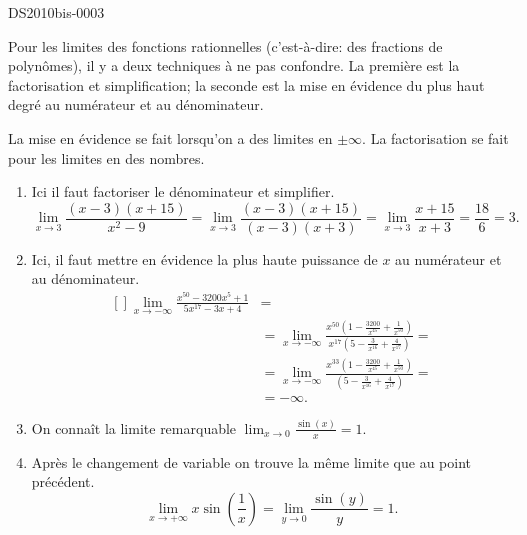 
\begin{corrige}{DS2010bis-0003}

	Pour les limites des fonctions rationnelles (c'est-à-dire: des fractions de polynômes), il y a deux techniques à ne pas confondre. La première est la factorisation et simplification; la seconde est la mise en évidence du plus haut degré au numérateur et au dénominateur.

	La mise en évidence se fait lorsqu'on a des limites en $\pm\infty$. La factorisation se fait pour les limites en des nombres.
	\begin{enumerate}
		\item
			Ici il faut factoriser le dénominateur et simplifier.
			\begin{equation}
			\lim_{x\to 3} \frac{(x-3)(x+15)}{x^2-9}	= \lim_{x\to 3} \frac{(x-3)(x+15)}{(x-3)(x+3)}=\lim_{x\to 3} \frac{x+15}{x+3}=\frac{18}{6}=3.
			\end{equation}
		\item
			Ici, il faut mettre en évidence la plus haute puissance de $x$ au numérateur et au dénominateur.
			\begin{equation}
				\begin{aligned}[]
				\lim_{x\to -\infty}\frac{x^{50}-3200x^{5}+1}{5x^{17}-3x+4}&= \\
                                &=\lim_{x\to -\infty}\frac{x^{50}\left(1-\frac{3200}{x^{45}}+\frac{1}{x^{50}}\right)}{x^{17}\left(5-\frac{3}{x^{16}}+\frac{4}{x^{17}}\right)}=\\
                                  &=\lim_{x\to -\infty}\frac{x^{33}\left(1-\frac{3200}{x^{45}}+\frac{1}{x^{50}}\right)}{\left(5-\frac{3}{x^{16}}+\frac{4}{x^{17}}\right)}=\\
                                    &=-\infty.
				\end{aligned}
			\end{equation}
		\item
			On connaît la limite remarquable $\lim_{x\to 0} \frac{ \sin(x) }{ x }=1$. 
		\item
			Après le changement de variable on trouve la même limite que au point précédent.
			\begin{equation}
                            \lim_{x\to +\infty} x \sin (\frac{1}{x})=\lim_{y\to 0} \frac{ \sin(y) }{ y }=1.
			\end{equation}

\end{enumerate}
\end{corrige}
